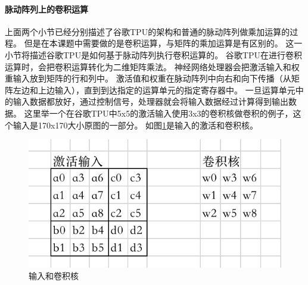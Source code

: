 \paragraph{脉动阵列上的卷积运算}
上面两个小节已经分别描述了谷歌TPU的架构和普通的脉动阵列做乘加运算的过程。
但是在本课题中需要做的是卷积运算，与矩阵的乘加运算是有区别的。
这一小节将描述谷歌TPU是如何基于脉动阵列执行卷积运算的。
谷歌TPU在进行卷积运算时，会把卷积运算转化为二维矩阵乘法。
神经网络处理器会把激活输入和权重输入放到矩阵的行和列中。
激活值和权重在脉动阵列中向右和向下传播（从矩阵左边和上边输入），直到到达指定的运算单元的指定寄存器中。
一旦运算单元中的输入数据都放好，通过控制信号，处理器就会将输入数据经过计算得到输出数据。
这里举一个在谷歌TPU中5x5的激活输入使用3x3的卷积核做卷积的例子，这个输入是170x170大小原图的一部分。
如图\ref{fig:activation_and_kernel}是输入的激活和卷积核。
\begin{figure}[htbp]
    \centering
    \includegraphics[]{figures/activation_and_kernel.png}
    \caption{输入和卷积核}
    \label{fig:activation_and_kernel}
\end{figure} 

